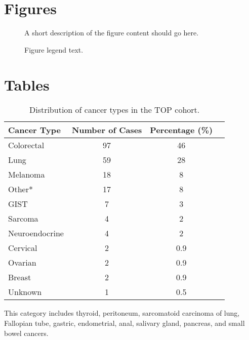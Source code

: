 \documentclass{bmcart}
\begin{document}
\begin{backmatter}


\section*{Figures}
  \begin{figure}[h!]
  \caption{
      A short description of the figure content
      should go here.}
      \end{figure}

\begin{figure}[h!]
  \caption{
      Figure legend text.}
      \end{figure}


\section*{Tables}

\begin{table}[h!]
\caption{Distribution of cancer types in the TOP cohort.}
      \begin{tabular}{lccc}
        \hline
        Cancer Type & Number of Cases & Percentage (\%) \\ \hline
        Colorectal & 97 & 46 \\
        Lung & 59 & 28 \\
        Melanoma & 18 & 8 \\
				Other* & 17 & 8 \\
				GIST & 7 & 3 \\
				Sarcoma & 4 & 2 \\
				Neuroendocrine & 4 & 2 \\
				Cervical & 2 & 0.9 \\
				Ovarian & 2 & 0.9 \\
				Breast & 2 & 0.9 \\
				Unknown & 1 & 0.5 \\ \hline
      \end{tabular}
\end{table}
{\small *This category includes thyroid, peritoneum, sarcomatoid carcinoma of lung, Fallopian tube, gastric, endometrial, anal, salivary gland, pancreas, and small bowel cancers.}


\end{backmatter}
\end{document}
